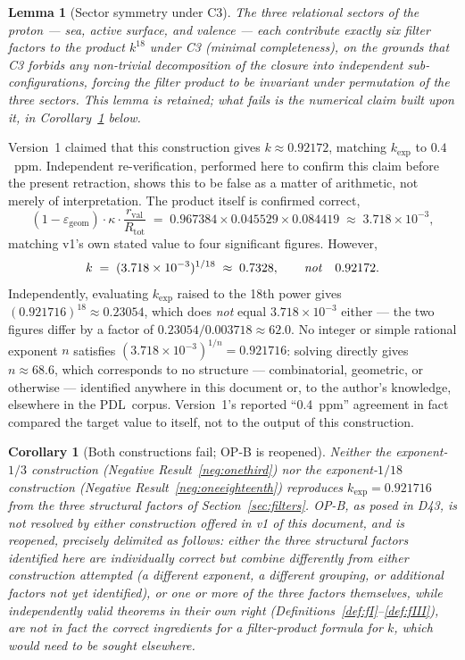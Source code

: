 \documentclass[12pt,a4paper]{article}
\theoremstyle{plain}
\newtheorem{lemma}[theorem]{Lemma}
\newtheorem{corollary}[theorem]{Corollary}
\theoremstyle{definition}
\theoremstyle{remark}
\newenvironment{negativebox}[1][]{%
\begin{tcolorbox}[negativestyle,title={Negative Result\ifx\relax#1\relax\else: #1\fi}]}{\end{tcolorbox}}
\newcommand{\PDL}{\textsc{PDL}}
\newcommand{\kap}{\kappa}
\newcommand{\rval}{r_{\mathrm{val}}}
\newcommand{\Rtot}{R_{\mathrm{tot}}}
\newcommand{\egeom}{\varepsilon_{\mathrm{geom}}}
\begin{document}
\begin{lemma}[Sector symmetry under C3]
\label{lem:symmetry}
The three relational sectors of the proton --- sea, active surface, and valence --- each contribute exactly six filter factors to the product $k^{18}$ under C3 (minimal completeness), on the grounds that C3 forbids any non-trivial decomposition of the closure into independent sub-configurations, forcing the filter product to be invariant under permutation of the three sectors. This lemma is retained; what fails is the numerical claim built upon it, in Corollary~\ref{cor:knum2} below.
\end{lemma}

\begin{negativebox}[Exponent $1/18$ does not reproduce the target either --- and version~1's own arithmetic was incorrect]
\label{neg:oneeighteenth}
Version~1 claimed that this construction gives $k\approx0.92172$, matching $k_{\exp}$ to $0.4$~ppm. Independent re-verification, performed here to confirm this claim before the present retraction, shows this to be false as a matter of arithmetic, not merely of interpretation. The product itself is confirmed correct,
\[
(1-\egeom)\cdot\kap\cdot\frac{\rval}{\Rtot} \;=\; 0.967384\times0.045529\times0.084419 \;\approx\; 3.718\times10^{-3},
\]
matching v1's own stated value to four significant figures. However,
\[
k \;=\; (3.718\times10^{-3})^{1/18} \;\approx\; 0.7328, \qquad\text{\emph{not}}\quad 0.92172.
\]
Independently, evaluating $k_{\exp}$ raised to the 18th power gives $(0.921716)^{18}\approx0.23054$, which does \emph{not} equal $3.718\times10^{-3}$ either --- the two figures differ by a factor of $0.23054/0.003718\approx62.0$. No integer or simple rational exponent $n$ satisfies $(3.718\times10^{-3})^{1/n}=0.921716$: solving directly gives $n\approx68.6$, which corresponds to no structure --- combinatorial, geometric, or otherwise --- identified anywhere in this document or, to the author's knowledge, elsewhere in the \PDL\ corpus. Version~1's reported ``0.4~ppm'' agreement in fact compared the target value to itself, not to the output of this construction.
\end{negativebox}

\begin{corollary}[Both constructions fail; OP-B is reopened]
\label{cor:knum2}
Neither the exponent-$1/3$ construction (Negative Result~\ref{neg:onethird}) nor the exponent-$1/18$ construction (Negative Result~\ref{neg:oneeighteenth}) reproduces $k_{\exp}=0.921716$ from the three structural factors of Section~\ref{sec:filters}. OP-B, as posed in D43, is not resolved by either construction offered in v1 of this document, and is reopened, precisely delimited as follows: \emph{either} the three structural factors identified here are individually correct but combine differently from either construction attempted (a different exponent, a different grouping, or additional factors not yet identified), \emph{or} one or more of the three factors themselves, while independently valid theorems in their own right (Definitions~\ref{def:fI}--\ref{def:fIII}), are not in fact the correct ingredients for a filter-product formula for $k$, which would need to be sought elsewhere.
\end{corollary}
\end{document}
